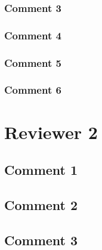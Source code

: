 \documentclass[a4paper,11pt,twocolumn]{article}
\begin{document}
\subsubsection{Comment 3}
\subsubsection{Comment 4}
\subsubsection{Comment 5}
\subsubsection{Comment 6}

\section{Reviewer 2}

\subsection{Comment 1}
\subsection{Comment 2}
\subsection{Comment 3}
\end{document}
